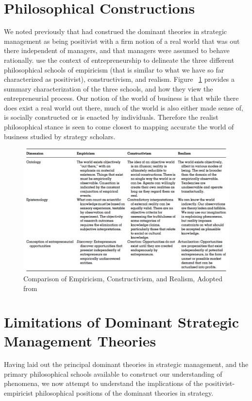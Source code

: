 \documentclass[12pt]{article}
\begin{document}
\section{Philosophical Constructions}
We noted previously that \cite{Teece1997b} had construed the dominant theories in strategic management as being positivist with a firm notion of a real world that was out there independent of managers, and that managers were assumed to behave rationally. \cite{Ramoglou2016} use the context of entrepreneurship to delineate the three different philosophical schools of empiricism (that is similar to what we have so far characterized as positivist), constructivism, and realism. Figure ~\ref{fig:comparison} provides a summary characterization of the three schools, and how they view the entrepreneurial process. Our notion of the world of business is that  while there does exist a real world out there, much of the world is also either made sense of, is socially constructed or is enacted by individuals. Therefore the realist philosophical stance is seen to come closest to mapping accurate the world of business studied by strategy scholars.
\begin{figure}[h]
\centering
\includegraphics[width=16cm]{Ramoglou2016}
\caption{Comparison of Empiricism, Constructivism, and Realism, Adopted from \cite{Ramoglou2016}}
\label{fig:comparison}
\end{figure}

\section{Limitations of Dominant Strategic Management Theories}\label{S:LimitationsDominantTheories}
Having laid out the principal dominant theories in strategic management, and the primary philosophical schools available to construct our understanding of phenomena, we now attempt to understand the implications of the positivist-empiricist philosophical positions of the dominant theories in strategy.
\end{document}
